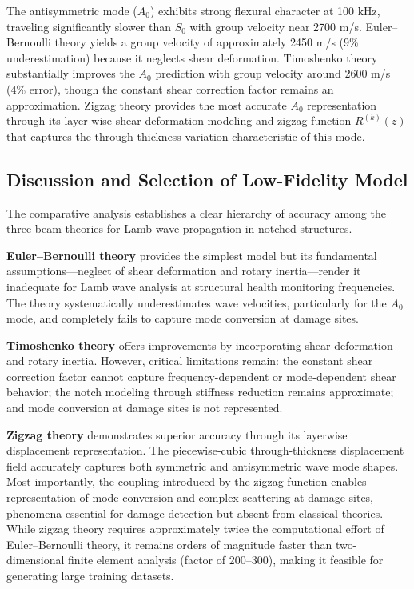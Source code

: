 \documentclass[12pt,a4paper]{report}
\begin{document}
The antisymmetric mode ($A_0$) exhibits strong flexural character at 100 kHz, traveling significantly slower than $S_0$ with group velocity near 2700 m/s. Euler--Bernoulli theory yields a group velocity of approximately 2450 m/s (9\% underestimation) because it neglects shear deformation. Timoshenko theory substantially improves the $A_0$ prediction with group velocity around 2600 m/s (4\% error), though the constant shear correction factor remains an approximation. Zigzag theory provides the most accurate $A_0$ representation through its layer-wise shear deformation modeling and zigzag function $R^{(k)}(z)$ that captures the through-thickness variation characteristic of this mode.


\subsection{Discussion and Selection of Low-Fidelity Model}

The comparative analysis establishes a clear hierarchy of accuracy among the three beam theories for Lamb wave propagation in notched structures.

\textbf{Euler--Bernoulli theory} provides the simplest model but its fundamental assumptions—neglect of shear deformation and rotary inertia—render it inadequate for Lamb wave analysis at structural health monitoring frequencies. The theory systematically underestimates wave velocities, particularly for the $A_0$ mode, and completely fails to capture mode conversion at damage sites.

\textbf{Timoshenko theory} offers improvements by incorporating shear deformation and rotary inertia. However, critical limitations remain: the constant shear correction factor cannot capture frequency-dependent or mode-dependent shear behavior; the notch modeling through stiffness reduction remains approximate; and mode conversion at damage sites is not represented.

\textbf{Zigzag theory} demonstrates superior accuracy through its layerwise displacement representation. The piecewise-cubic through-thickness displacement field accurately captures both symmetric and antisymmetric wave mode shapes. Most importantly, the coupling introduced by the zigzag function enables representation of mode conversion and complex scattering at damage sites, phenomena essential for damage detection but absent from classical theories. While zigzag theory requires approximately twice the computational effort of Euler--Bernoulli theory, it remains orders of magnitude faster than two-dimensional finite element analysis (factor of 200--300), making it feasible for generating large training datasets.
\end{document}
